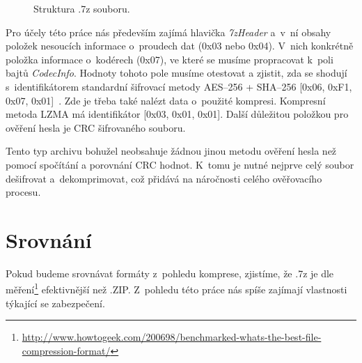 \begin{figure}[ht]
    \begin{center}
    \end{center}
    \caption{Struktura .7z souboru. \cite{Pavlov:2015}}
    \label{7zstruct}
\end{figure}
Pro účely této práce nás především zajímá hlavička {\it 7zHeader} a~v~ní obsahy položek nesoucích
informace o~proudech dat (0x03 nebo 0x04). V~nich konkrétně položka informace o~kodérech (0x07),
ve které se musíme propracovat k~poli bajtů {\it CodecInfo}. Hodnoty tohoto pole musíme otestovat
a zjistit, zda se shodují s~identifikátorem standardní šifrovací metody AES--256 + SHA--256
[0x06, 0xF1, 0x07, 0x01]~\cite{Pavlov:2015}. Zde je třeba také nalézt data o~použité kompresi.
Kompresní metoda LZMA má identifikátor [0x03, 0x01, 0x01]. Další důležitou položkou pro ověření
hesla je CRC šifrovaného souboru.

Tento typ archivu bohužel neobsahuje žádnou jinou metodu ověření hesla než pomocí spočítání a
porovnání CRC hodnot. K~tomu je nutné nejprve celý soubor dešifrovat a~dekomprimovat, což přidává
na náročnosti celého ověřovacího procesu.

\section{Srovnání}
Pokud budeme srovnávat formáty z~pohledu komprese, zjistíme, že .7z je dle
měření\footnote{\url{http://www.howtogeek.com/200698/benchmarked-whats-the-best-file-compression-format/}}
efektivnější než .ZIP. Z~pohledu této práce nás spíše zajímají vlastnosti týkající se zabezpečení.


